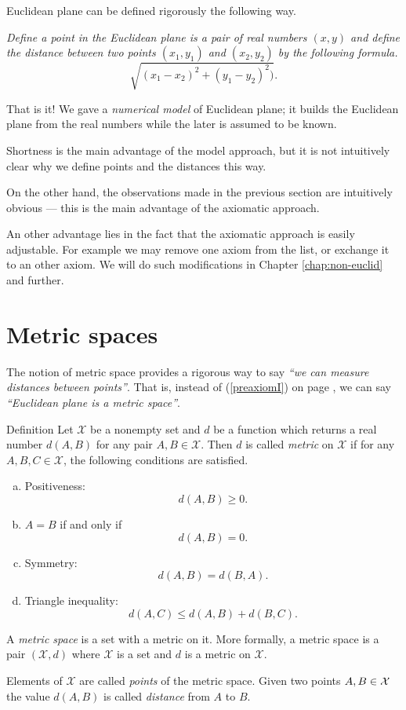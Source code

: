 Euclidean plane can be defined rigorously the following way.

{}\emph{Define a {}\emph{point} in the Euclidean plane is a pair of real numbers $(x,y)$ and define the {}\emph{distance} between two points $(x_1,y_1)$ and $(x_2,y_2)$ by the following formula.}
\[\sqrt{(x_1-x_2)^2+(y_1-y_2)^2)}.\]

That is it!
We gave a {}\emph{numerical model} of Euclidean plane;
it builds the Euclidean plane from the real numbers
while the later is assumed to be known.

Shortness is the main advantage of the model approach,
but it is not intuitively clear why we define points and the distances this way.

On the other hand, the observations made in the previous section are  intuitively obvious ---
this is the main advantage of the axiomatic approach.

An other advantage lies in the fact that the axiomatic approach is easily adjustable. 
For example we may remove one axiom from the list,
or exchange it to an other axiom. 
We will do such modifications in Chapter \ref{chap:non-euclid} and further.

\section*{Metric spaces}

The notion of metric space provides 
a rigorous way to say {}\emph{``we can measure distances between points''}.
That is, instead of (\ref{preaxiomI}) on page \pageref{preaxiomI},
we can say {}\emph{``Euclidean plane is a metric space''}.

\begin{thm}{Definition}\label{def:metric-space}
Let $\mathcal X$ be a nonempty set and 
$d$ be a function
which returns a real number $d(A,B)$
for any pair $A,B\in\mathcal X$.
Then $d$
is called \emph{metric} on 
$\mathcal X$ if for any
$A,B,C\in \mathcal X$, the following conditions are satisfied.
\begin{enumerate}[(a)]
\item\label{def:metric-space:a} Positiveness: 
$$d(A,B)\ge 0.$$
\item\label{def:metric-space:b}  $A=B$ if and only if 
$$d(A,B)=0.$$
\item\label{def:metric-space:c} Symmetry: $$d(A, B) = d(B, A).$$
\item\label{def:metric-space:d} Triangle inequality: 
$$d(A, C) \le d(A, B) + d(B, C).$$
\end{enumerate}
A \emph{metric space} is a set with a metric on it. 
More formally, a metric space is a pair $(\mathcal X, d)$ where $\mathcal X$ is a set and $d$ is a metric on $\mathcal X$.

Elements of $\mathcal X$ are called \emph{points} of the metric space.
Given two points $A,B\z\in \mathcal X$ the value
$d(A, B)$ is called \emph{distance} from $A$ to $B$.
\end{thm}

